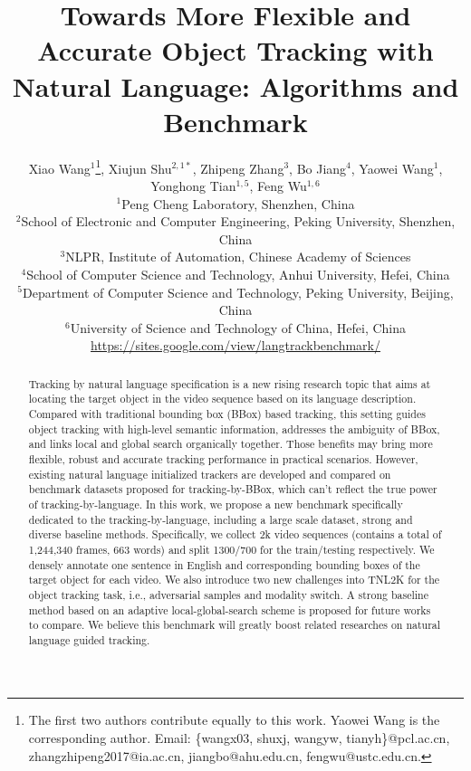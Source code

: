 \documentclass[final]{cvpr}
\begin{document}
\title{Towards More Flexible and Accurate Object Tracking with Natural Language: Algorithms and Benchmark	}
\author{
Xiao Wang$^{1}$\thanks{The first two authors contribute equally to this work. Yaowei Wang is the corresponding author. Email: \{wangx03, shuxj, wangyw, tianyh\}@pcl.ac.cn, zhangzhipeng2017@ia.ac.cn, jiangbo@ahu.edu.cn, fengwu@ustc.edu.cn.}, Xiujun Shu$^{2,1*}$, Zhipeng Zhang$^{3}$, Bo Jiang$^{4}$, Yaowei Wang$^{1}$, Yonghong Tian$^{1,5}$, Feng Wu$^{1,6}$ \\ 
${^1}$Peng Cheng Laboratory, Shenzhen, China \\
${^2}$School of Electronic and Computer Engineering, Peking University, Shenzhen, China  \\
${^3}$NLPR, Institute of Automation, Chinese Academy of Sciences \\
${^4}$School of Computer Science and Technology, Anhui University, Hefei, China \\
${^5}$Department of Computer Science and Technology, Peking University, Beijing, China  \\
${^6}$University of Science and Technology of China, Hefei, China \\
\url{https://sites.google.com/view/langtrackbenchmark/}
}




\maketitle


\begin{abstract}
Tracking by natural language specification is a new rising research topic that aims at locating the target object in the video sequence based on its language description. Compared with traditional bounding box (BBox) based tracking, this setting guides object tracking with high-level semantic information, addresses the ambiguity of BBox, and links local and global search organically together. Those benefits may bring more flexible, robust and accurate tracking performance in practical scenarios. However, existing natural language initialized trackers are developed and compared on benchmark datasets proposed for tracking-by-BBox, which can't reflect the true power of tracking-by-language. In this work, we propose a new benchmark specifically dedicated to the tracking-by-language, including a large scale dataset, strong and diverse baseline methods. Specifically, we collect 2k video sequences (contains a total of 1,244,340 frames, 663 words) and split 1300/700 for the train/testing respectively. We densely annotate one sentence in English and corresponding bounding boxes of the target object for each video. We also introduce two new challenges into TNL2K for the object tracking task, i.e., adversarial samples and modality switch. A strong baseline method based on an adaptive local-global-search scheme is proposed for future works to compare. We believe this benchmark will greatly boost related researches on natural language guided tracking. 
\end{abstract}
\end{document}
